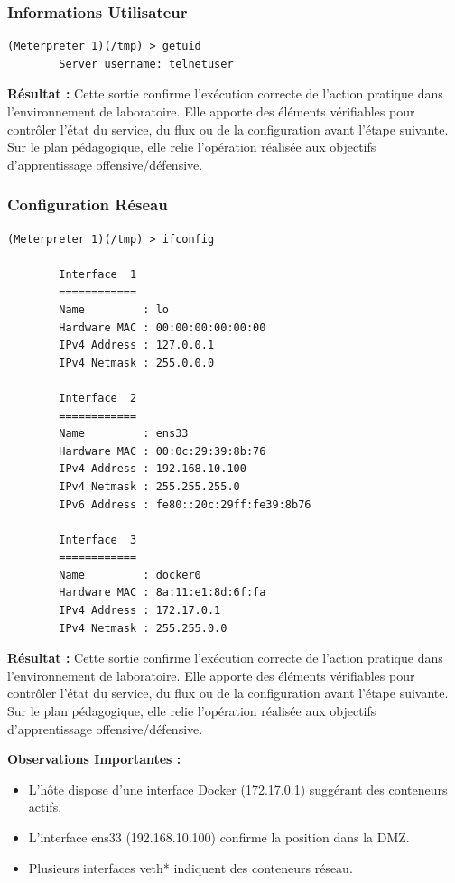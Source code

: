 \documentclass[12pt,a4paper,openany]{report}
\begin{document}
	
	\subsubsection{Informations Utilisateur}
	
	\begin{lstlisting}[caption=Identité de l'Agent]
		(Meterpreter 1)(/tmp) > getuid
		Server username: telnetuser
	\end{lstlisting}
	
	\textbf{Résultat :} Cette sortie confirme l'exécution correcte de l'action pratique dans l'environnement de laboratoire. Elle apporte des éléments vérifiables pour contrôler l'état du service, du flux ou de la configuration avant l'étape suivante. Sur le plan pédagogique, elle relie l'opération réalisée aux objectifs d'apprentissage offensive/défensive.
	
	
	\subsubsection{Configuration Réseau}
	
	\begin{lstlisting}[caption=Interfaces Réseau Détectées]
		(Meterpreter 1)(/tmp) > ifconfig
		
		Interface  1
		============
		Name         : lo
		Hardware MAC : 00:00:00:00:00:00
		IPv4 Address : 127.0.0.1
		IPv4 Netmask : 255.0.0.0
		
		Interface  2
		============
		Name         : ens33
		Hardware MAC : 00:0c:29:39:8b:76
		IPv4 Address : 192.168.10.100
		IPv4 Netmask : 255.255.255.0
		IPv6 Address : fe80::20c:29ff:fe39:8b76
		
		Interface  3
		============
		Name         : docker0
		Hardware MAC : 8a:11:e1:8d:6f:fa
		IPv4 Address : 172.17.0.1
		IPv4 Netmask : 255.255.0.0
	\end{lstlisting}
	
	\textbf{Résultat :} Cette sortie confirme l'exécution correcte de l'action pratique dans l'environnement de laboratoire. Elle apporte des éléments vérifiables pour contrôler l'état du service, du flux ou de la configuration avant l'étape suivante. Sur le plan pédagogique, elle relie l'opération réalisée aux objectifs d'apprentissage offensive/défensive.
	
	
	\textbf{Observations Importantes :}
	\begin{itemize}
		\item L'hôte dispose d'une interface Docker (172.17.0.1) suggérant des conteneurs actifs.
		\item L'interface ens33 (192.168.10.100) confirme la position dans la DMZ.
		\item Plusieurs interfaces veth* indiquent des conteneurs réseau.
	\end{itemize}
	
\end{document}
